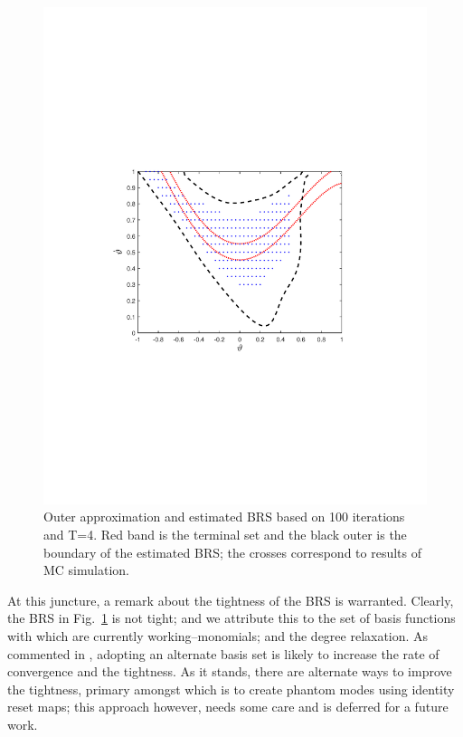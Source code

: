 \begin{figure}[!t]
  \includegraphics[trim=1.5in 3.3in 1.5in 3.5in, clip=true,width=\columnwidth]{figures/rw_0p1_4_new}
  \caption{Outer approximation and estimated BRS based on 100 iterations and T=4. Red band is the terminal set and the black outer is the boundary of the estimated BRS; the crosses correspond to results of MC simulation.}
  \label{fig:rw_brs}
\end{figure}
\par
At this juncture, a remark about the tightness of the BRS is warranted. Clearly, the BRS in Fig.~\ref{fig:rw_brs} is not tight; and we attribute this to the set of basis functions with which are currently working--monomials; and the degree relaxation. As commented in \cite{henrion2014convex}, adopting an alternate basis set is likely to increase the rate of convergence and the tightness. As it stands, there are alternate ways to improve the tightness, primary amongst which is to create phantom modes using identity reset maps; this approach however, needs some care and is deferred for a future work.
